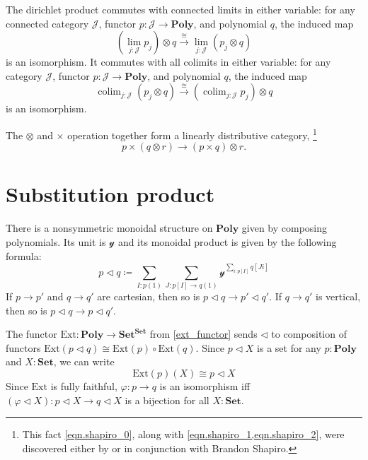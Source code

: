 \documentclass[11pt, one side, article]{memoir}
\theoremstyle{definition}
\theoremstyle{plain}
\DeclareMathOperator*{\colim}{colim}
\newcommand{\cat}[1]{\mathcal{#1}}%
\newcommand{\Cat}[1]{\mathbf{#1}}%
\newcommand{\fun}[1]{\mathrm{#1}}%
\newcommand{\To}[2][]{\xrightarrow[#1]{#2}}
\newcommand{\smset}{\Cat{Set}}
\newcommand{\yon}{\mathcal{y}}
\newcommand{\poly}{\Cat{Poly}}
\newcommand{\0}{\textsf{0}}
\newcommand{\1}{\tn{\textsf{1}}}
\newcommand{\tri}{\mathbin{\triangleleft}}
\newcommand{\ext}{\fun{Ext}}
\begin{document}
The dirichlet product commutes with connected limits in either variable: for any connected category $\cat{J}$, functor $p\colon\cat{J}\to\poly$, and polynomial $q$, the induced map
\begin{equation}
	\left(\lim_{j:\cat{J}}p_j\right)\otimes q
	\To{\cong}
	\lim_{j:\cat{J}}(p_j\otimes q)
\end{equation}
is an isomorphism. It commutes with all colimits in either variable: for any category $\cat{J}$, functor $p\colon\cat{J}\to\poly$, and polynomial $q$, the induced map
\begin{equation}
	\colim_{j:\cat{J}}(p_j\otimes q)
	\To{\cong}
	\left(\colim_{j:\cat{J}}p_j\right)\otimes q
\end{equation}
is an isomorphism.

The $\otimes$ and $\times$ operation together form a linearly distributive category,%
\footnote{This fact \eqref{eqn.shapiro_0}, along with \cref{eqn.shapiro_1,eqn.shapiro_2}, were discovered either by or in conjunction with Brandon Shapiro.}
\begin{equation}\label{eqn.shapiro_0}
p\times(q\otimes r)\to (p\times q)\otimes r.
\end{equation}

\chapter{Substitution product}

There is a nonsymmetric monoidal structure on $\poly$ given by composing polynomials. Its unit is $\yon$ and its monoidal product is given by the following formula:
\begin{equation}
p\tri q\coloneqq\sum_{I: p(1)}\sum_{J\colon p[I]\to q(1)}\yon^{\sum\limits_{i: p[I]}q[Ji]}
\end{equation}
If $p\to p'$ and $q\to q'$ are cartesian, then so is $p\tri q\to p'\tri q'$. If $q\to q'$ is vertical, then so is $p\tri q\to p\tri q'$. 

The functor $\ext\colon\poly\to\smset^\smset$ from \eqref{ext_functor} sends $\tri$ to composition of functors $\ext(p\tri q)\cong\ext(p)\circ\ext(q)$. Since $p\tri X$ is a set for any $p:\poly$ and $X:\smset$, we can write
\begin{equation}
\ext(p)(X)\cong p\tri X
\end{equation}
Since $\ext$ is fully faithful, $\varphi\colon p\to q$ is an isomorphism iff $(\varphi\tri X)\colon p\tri X\to q\tri X$ is a bijection for all $X:\smset$.
\end{document}
